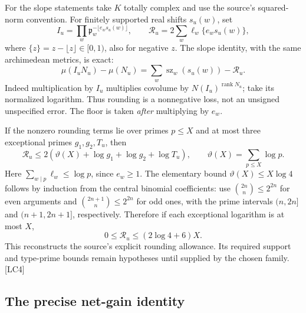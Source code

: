 \documentclass[11pt,a4paper]{article}
\numberwithin{equation}{section}
\theoremstyle{remark}\newtheorem{remark}[theorem]{Remark}
\begin{document}
For the slope statements take $K$ totally complex and use the source's squared-norm convention. For finitely supported real shifts $s_u(w)$, set
\[
I_u=\prod_w\mathfrak p_w^{-\lfloor e_ws_u(w)\rfloor},\qquad
\mathcal R_u=2\sum_w\ell_w\{e_ws_u(w)\},
\]
where $\{z\}=z-\lfloor z\rfloor\in[0,1)$, also for negative $z$. The slope identity, with the same archimedean metrics, is exact:
\begin{equation}\label{eq:round-exact}
\mu(I_uN_u)-\mu(N_u)
=\sum_w\operatorname{sz}_w(s_u(w))-\mathcal R_u.
\end{equation}
Indeed multiplication by $I_u$ multiplies covolume by $N(I_u)^{\operatorname{rank}N_u}$; take its normalized logarithm. Thus rounding is a nonnegative loss, not an unsigned unspecified error. The floor is taken \emph{after} multiplying by $e_w$.\cite{local-div-defs}

If the nonzero rounding terms lie over primes $p\le X$ and at most three exceptional primes $g_1,g_2,T_u$, then
\[
\mathcal R_u\le2\left(\vartheta(X)+\log g_1+\log g_2+\log T_u\right),
\qquad \vartheta(X)=\sum_{p\le X}\log p.
\]
Here $\sum_{w\mid p}\ell_w\le\log p$, since $e_w\ge1$. The elementary bound $\vartheta(X)\le X\log4$ follows by induction from the central binomial coefficients: use $\binom{2n}{n}\le2^{2n}$ for even arguments and $\binom{2n+1}{n}\le2^{2n}$ for odd ones, with the prime intervals $(n,2n]$ and $(n+1,2n+1]$, respectively. Therefore if each exceptional logarithm is at most $X$,
\begin{equation}\label{eq:round-source}
0\le\mathcal R_u\le(2\log4+6)X.
\end{equation}
This reconstructs the source's explicit rounding allowance. Its required support and type-prime bounds remain hypotheses until supplied by the chosen family. \textsf{[LC4]}\cite{local-rounding}

\subsection{The precise net-gain identity}
\end{document}
